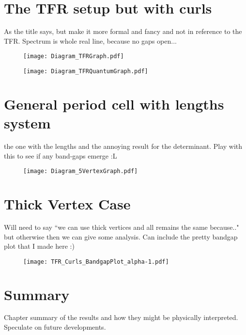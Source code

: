 \section{The TFR setup but with curls}
As the title says, but make it more formal and fancy and not in reference to the TFR. 
Spectrum is whole real line, because no gaps open...
\begin{figure}[h]
	\centering
	\texttt{[image: Diagram\_TFRGraph.pdf]}
	\caption{\label{fig:Diagram_TFRGraph}}
\end{figure}
\begin{figure}[h]
	\centering
	\texttt{[image: Diagram\_TFRQuantumGraph.pdf]}
	\caption{\label{fig:Diagram_TFRQuantumGraph}}
\end{figure}

\section{General period cell with lengths system}
the one with the lengths and the annoying result for the determinant.
Play with this to see if any band-gaps emerge :L
\begin{figure}[h]
	\centering
	\texttt{[image: Diagram\_5VertexGraph.pdf]}
	\caption{\label{fig:Diagram_5VertexGraph}}
\end{figure}

\section{Thick Vertex Case}
Will need to say ``we can use thick vertices and all remains the same because.." but otherwise then we can give some analysis.
Can include the pretty bandgap plot that I made here :)
\begin{figure}[h]
	\centering
	\texttt{[image: TFR\_Curls\_BandgapPlot\_alpha-1.pdf]}
	\caption{\label{fig:TFR_Curls_BandgapPlot_alpha-1}}
\end{figure}

\section{Summary}
Chapter summary of the results and how they might be physically interpreted.
Speculate on future developments.